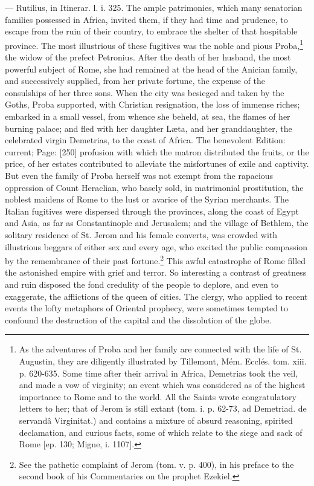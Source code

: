 {\texthebrew{—} Rutilius, in Itinerar. l. i. 325.} The ample patrimonies, which many senatorian families possessed in Africa, invited them, if they had time and prudence, to escape from the ruin of their country, to embrace the shelter of that hospitable province. The most illustrious of these fugitives was the noble and pious Proba,\footnote{As the adventures of Proba and her family are connected with the life of St. Augustin, they are diligently illustrated by Tillemont, Mém. Ecclés. tom. xiii. p. 620-635. Some time after their arrival in Africa, Demetrias took the veil, and made a vow of virginity; an event which was considered as of the highest importance to Rome and to the world. All the Saints wrote congratulatory letters to her; that of Jerom is still extant (tom. i. p. 62-73, ad Demetriad. de servandâ Virginitat.) and contains a mixture of absurd reasoning, spirited declamation, and curious facts, some of which relate to the siege and sack of Rome [ep. 130; Migne, i. 1107].} the widow of the prefect Petronius. After the death of her husband, the most powerful subject of Rome, she had remained at the head of the Anician family, and successively supplied, from her private fortune, the expense of the consulships of her three sons. When the city was besieged and taken by the Goths, Proba supported, with Christian resignation, the loss of immense riches; embarked in a small vessel, from whence she beheld, at sea, the flames of her burning palace; and fled with her daughter Læta, and her granddaughter, the celebrated virgin Demetrias, to the coast of Africa. The benevolent Edition: current; Page: [250] profusion with which the matron distributed the fruits, or the price, of her estates contributed to alleviate the misfortunes of exile and captivity. But even the family of Proba herself was not exempt from the rapacious oppression of Count Heraclian, who basely sold, in matrimonial prostitution, the noblest maidens of Rome to the lust or avarice of the Syrian merchants. The Italian fugitives were dispersed through the provinces, along the coast of Egypt and Asia, as far as Constantinople and Jerusalem; and the village of Bethlem, the solitary residence of St. Jerom and his female converts, was crowded with illustrious beggars of either sex and every age, who excited the public compassion by the remembrance of their past fortune.\footnote{See the pathetic complaint of Jerom (tom. v. p. 400), in his preface to the second book of his Commentaries on the prophet Ezekiel.} This awful catastrophe of Rome filled the astonished empire with grief and terror. So interesting a contrast of greatness and ruin disposed the fond credulity of the people to deplore, and even to exaggerate, the afflictions of the queen of cities. The clergy, who applied to recent events the lofty metaphors of Oriental prophecy, were sometimes tempted to confound the destruction of the capital and the dissolution of the globe.

